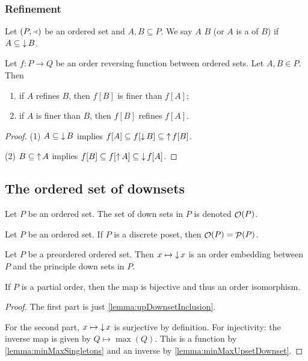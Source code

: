\subsubsection{Refinement}
\begin{definition}
Let $\left( P,\Yleft \right)$ be an ordered set and $A,B \subseteq P$. We say $A$  $B$ (or $A$ is a  of $B$) if $A\subseteq \mathop{\downarrow} B$.
\end{definition}

\begin{lemma}
Let $f:P\to Q$ be an order reversing function between ordered sets. Let $A,B\in P$. Then
\begin{enumerate}
\item if $A$ refines $B$, then $f[B]$ is finer than $f[A]$;
\item if $A$ is finer than $B$, then $f[B]$ refines $f[A]$.
\end{enumerate}
\end{lemma}
\begin{proof}
(1) $A \subseteq \mathop{\downarrow} B$ implies $f[A] \subseteq f[\mathop{\downarrow} B] \subseteq \mathop{\uparrow} f[B]$.

(2) $B \subseteq \mathop{\uparrow} A$ implies $f[B] \subseteq f[\mathop{\uparrow} A] \subseteq \mathop{\downarrow} f[A]$.
\end{proof}

\subsection{The ordered set of downsets}
\begin{definition}
Let $P$ be an ordered set. The set of down sets in $P$ is denoted $\mathop{\mathcal{O}}(P)$.
\end{definition}

\begin{lemma}
Let $P$ be an ordered set.
If $P$ is a discrete poset, then $\mathop{\mathcal{O}}(P) = \mathop{\mathcal{P}}(P)$.
\end{lemma}

\begin{proposition} \label{prop:orderedSetPowerset}
Let $P$ be a preordered ordered set. Then $x\mapsto \mathop{\downarrow} x$ is an order embedding between $P$ and the principle down sets in $P$.

If $P$ is a partial order, then the map is bijective and thus an order isomorphism.
\end{proposition}
\begin{proof}
The first part is just \ref{lemma:upDownsetInclusion}.

For the second part, $x\mapsto \mathop{\downarrow} x$ is surjective by definition. For injectivity: the inverse map is given by $Q\mapsto \max(Q)$. This is a function by \ref{lemma:minMaxSingletons} and an inverse by \ref{lemma:minMaxUpsetDownset}.
\end{proof}

